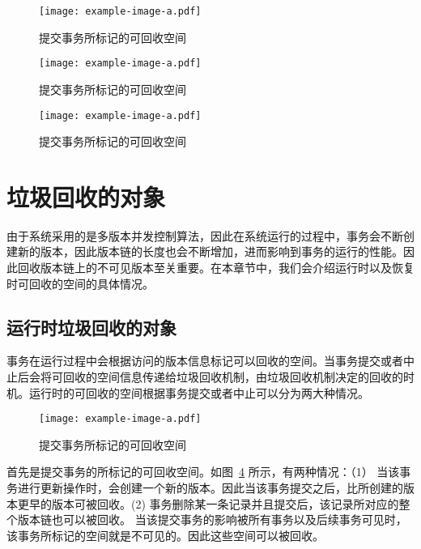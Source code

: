 \begin{figure}
    \centering
    \texttt{[image: example-image-a.pdf]}
    \caption{提交事务所标记的可回收空间}
    \label{fig:mvcc-insert}
\end{figure}

\begin{figure}
    \centering
    \texttt{[image: example-image-a.pdf]}
    \caption{提交事务所标记的可回收空间}
    \label{fig:mvcc-update}
\end{figure}

\begin{figure}
    \centering
    \texttt{[image: example-image-a.pdf]}
    \caption{提交事务所标记的可回收空间}
    \label{fig:mvcc-delete}
\end{figure}



\section{垃圾回收的对象}
\label{sec:space}

由于系统采用的是多版本并发控制算法，因此在系统运行的过程中，事务会不断创建新的版本，因此版本链的长度也会不断增加，进而影响到事务的运行的性能。因此回收版本链上的不可见版本至关重要。在本章节中，我们会介绍运行时以及恢复时可回收的空间的具体情况。

\subsection{运行时垃圾回收的对象}

事务在运行过程中会根据访问的版本信息标记可以回收的空间。当事务提交或者中止后会将可回收的空间信息传递给垃圾回收机制，由垃圾回收机制决定的回收的时机。运行时的可回收的空间根据事务提交或者中止可以分为两大种情况。

\begin{figure}
    \centering
    \texttt{[image: example-image-a.pdf]}
    \caption{提交事务所标记的可回收空间}
    \label{fig:space-commit}
\end{figure}

首先是提交事务的所标记的可回收空间。如图~\ref{fig:space-commit} 所示，有两种情况：（1） 当该事务进行更新操作时，会创建一个新的版本。因此当该事务提交之后，比所创建的版本更早的版本可被回收。(2) 事务删除某一条记录并且提交后，该记录所对应的整个版本链也可以被回收。 当该提交事务的影响被所有事务以及后续事务可见时，该事务所标记的空间就是不可见的。因此这些空间可以被回收。

